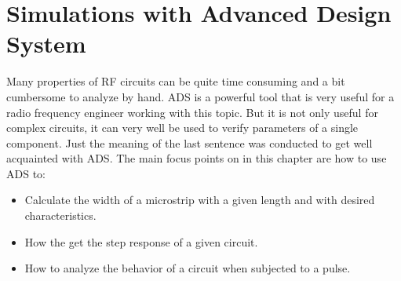 \documentclass[report.tex]{subfiles}
\begin{document}
\pagebreak \section{Simulations with Advanced Design System}
Many properties of RF circuits can be quite time consuming and a bit cumbersome to analyze by hand. ADS is a powerful tool that is very useful for a radio frequency engineer working with this topic. But it is not only useful for complex circuits, it can very well be used to verify parameters of a single component.
Just the meaning of the last sentence was conducted to get well acquainted with ADS. The main focus points on in this chapter are how to use ADS to:
\begin{itemize}
	\item Calculate the width of a microstrip with a given length and with desired characteristics.
	\item How the get the step response of a given circuit.
	\item How to analyze the behavior of a circuit when subjected to a pulse.
\end{itemize}







\end{document}
